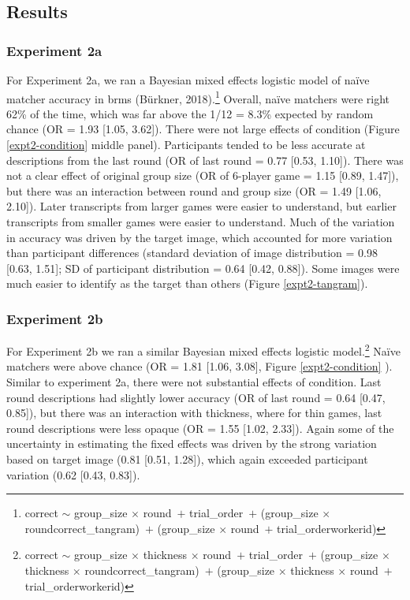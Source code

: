 \documentclass[10pt, letterpaper]{article}
\begin{document}
\subsection{Results}\label{results}

\subsubsection{Experiment 2a}\label{experiment-2a-1}

For Experiment 2a, we ran a Bayesian mixed effects logistic model of
naïve matcher accuracy in brms (Bürkner, 2018).\footnote{correct
  \({\sim}\) group\_size \({\times}\) round~\({+}\) trial\_order~\({+}\)
  (group\_size \({\times}\) round\textbar correct\_tangram)~\({+}\)
  (group\_size \({\times}\) round~\({+}\) trial\_order\textbar workerid)}
Overall, naïve matchers were right 62\% of the time, which was far above
the 1/12 = 8.3\% expected by random chance (OR = 1.93 {[}1.05, 3.62{]}).
There were not large effects of condition (Figure \ref{expt2-condition}
middle panel). Participants tended to be less accurate at descriptions
from the last round (OR of last round = 0.77 {[}0.53, 1.10{]}). There
was not a clear effect of original group size (OR of 6-player game =
1.15 {[}0.89, 1.47{]}), but there was an interaction between round and
group size (OR = 1.49 {[}1.06, 2.10{]}). Later transcripts from larger
games were easier to understand, but earlier transcripts from smaller
games were easier to understand. Much of the variation in accuracy was
driven by the target image, which accounted for more variation than
participant differences (standard deviation of image distribution = 0.98
{[}0.63, 1.51{]}; SD of participant distribution = 0.64 {[}0.42,
0.88{]}). Some images were much easier to identify as the target than
others (Figure \ref{expt2-tangram}).

\subsubsection{Experiment 2b}\label{experiment-2b-1}

For Experiment 2b we ran a similar Bayesian mixed effects logistic
model.\footnote{correct \({\sim}\) group\_size \({\times}\) thickness
  \({\times}\) round~\({+}\) trial\_order~\({+}\) (group\_size
  \({\times}\) thickness \({\times}\)
  round\textbar correct\_tangram)~\({+}\) (group\_size \({\times}\)
  thickness \({\times}\) round~\({+}\) trial\_order\textbar workerid)}
Naïve matchers were above chance (OR = 1.81 {[}1.06, 3.08{]}, Figure
\ref{expt2-condition} ). Similar to experiment 2a, there were not
substantial effects of condition. Last round descriptions had slightly
lower accuracy (OR of last round = 0.64 {[}0.47, 0.85{]}), but there was
an interaction with thickness, where for thin games, last round
descriptions were less opaque (OR = 1.55 {[}1.02, 2.33{]}). Again some
of the uncertainty in estimating the fixed effects was driven by the
strong variation based on target image (0.81 {[}0.51, 1.28{]}), which
again exceeded participant variation (0.62 {[}0.43, 0.83{]}).
\end{document}
